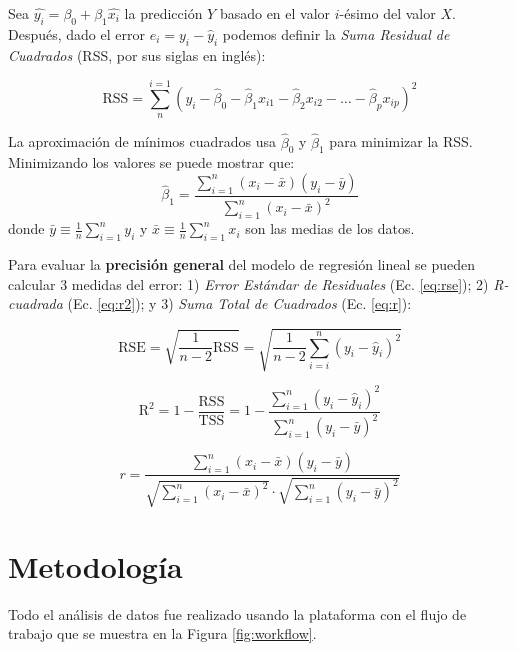 \documentclass[11pt, letterpaper]{article}
\begin{document}
Sea $\hat{y_i} = \beta_0 + \beta_1 \hat{x_i}$ la predicción $Y$ basado en el valor $i$-ésimo del valor $X$. Después, dado el error $e_i = y_i - \hat{y}_i$ podemos definir la \textit{Suma Residual de Cuadrados} (RSS, por sus siglas en inglés):

\begin{equation}
    \mathrm{RSS} = \sum_{n}^{i=1} (y_i - \hat{\beta}_0 - \hat{\beta}_{1} x_{i1} - \hat{\beta}_{2} x_{i2} - \ldots - \hat{\beta}_{p} x_{ip})^2
\end{equation}

La aproximación de mínimos cuadrados usa $\hat{\beta}_0$ y $\hat{\beta}_1$ para minimizar la RSS. Minimizando los valores se puede mostrar que:
\begin{equation}
    \hat{\beta}_1 = \frac{ \sum_{i=1}^{n} (x_i - \bar{x})(y_i - \bar{y}) }{ \sum_{i=1}^{n} (x_i - \bar{x})^2 }
\end{equation}
donde $\bar{y} \equiv \frac{1}{n}\sum_{i=1}^{n} y_i$ y $\bar{x} \equiv \frac{1}{n}\sum_{i=1}^{n} x_i$ son las medias de los datos.

Para evaluar la \textbf{precisión general} del modelo de regresión lineal se pueden calcular 3 medidas del error: 1) \textit{Error Estándar de Residuales} (Ec. \ref{eq:rse}); 2) \textit{R-cuadrada} (Ec. \ref{eq:r2}); y 3) \textit{Suma Total de Cuadrados} (Ec. \ref{eq:r}):

\begin{equation}
    \mathrm{RSE} = \sqrt{\frac{1}{n-2}\mathrm{RSS}} = 
    \sqrt{\frac{1}{n-2} \sum_{i=i}^{n} (y_i - \hat{y}_i)^2 }
    \label{eq:rse}
\end{equation}

\begin{equation}
    \mathrm{R^2} = 1-\mathrm{\frac{RSS}{TSS}} = 
    1 - \frac{\sum_{i=1}^{n} (y_i - \hat{y}_i)^2 }{\sum_{i=1}^{n} (y_i - \bar{y})^2}
    \label{eq:r2}
\end{equation}

\begin{equation}
    r = \frac{ \sum_{i=1}^{n} (x_i - \bar{x})(y_i - \bar{y}) }{
    \sqrt{ \sum_{i=1}^{n} (x_i - \bar{x})^2 }
    \cdot
    \sqrt{ \sum_{i=1}^{n} (y_i - \bar{y})^2 }
    }
    \label{eq:r}
\end{equation}

\section{Metodología}

Todo el análisis de datos fue realizado usando la plataforma  con el flujo de trabajo que se muestra en la Figura \ref{fig:workflow}.
\end{document}
